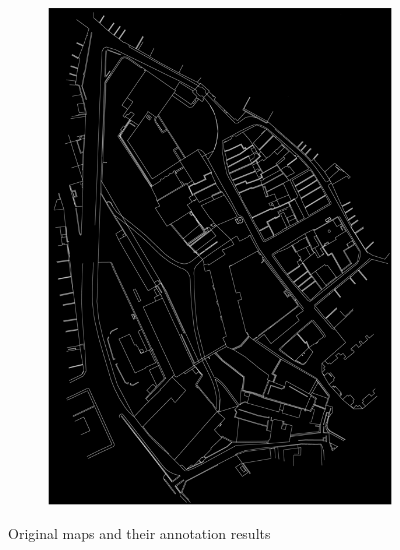 \documentclass[12pt]{article}
\begin{document}
\begin{figure}[H]
\begin{subfigure}[b]{.5\textwidth}
		\includegraphics[width=1\linewidth]{images/label1.png}  
		\label{fig:sub-second}
	\end{subfigure}
	
	\caption{Original maps and their annotation results}
	\label{fig:whole-annotation}
\end{figure}
\end{document}
